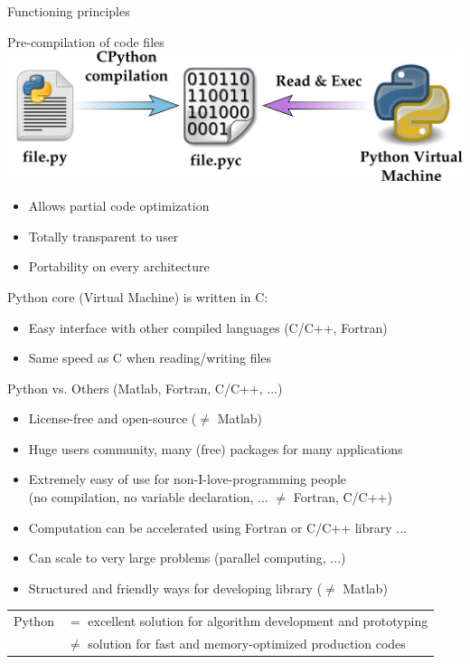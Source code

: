 \documentclass[11pt,unknownkeysallowed,usenames,dvipsnames]{beamer}
\begin{document}
	\begin{frame}{Functioning principles}
        \begin{block}{Pre-compilation of code files}
            \centering
            \includegraphics[width=0.8\linewidth]{cpython}
            
            \vspace*{-20pt}   
            \begin{itemize}
                \item Allows partial code optimization
                \item Totally transparent to user
                \item Portability on every architecture
            \end{itemize}
        \end{block}
        Python core (Virtual Machine) is written in C:
        
        \vspace*{-5pt}
        \begin{itemize}
            \item Easy interface with other compiled languages (C/C++, Fortran)
            \item Same speed as C when reading/writing files
        \end{itemize}
        
        \vspace*{-20pt}
    \end{frame}

	\begin{frame}{Python vs. Others (Matlab, Fortran, C/C++, ...)}
        \begin{itemize}
            \item License-free and open-source ($\neq$ Matlab)
            \item Huge users community, many (free) packages for many applications
            \item Extremely easy of use for non-I-love-programming people \\ (no compilation, no variable declaration, ... $\neq$ Fortran, C/C++)
            \item Computation can be accelerated using Fortran or C/C++
            library ... 
            \item Can scale to very large problems (parallel computing, ...)
            \item Structured and friendly ways for developing library ($\neq$ Matlab)
        \end{itemize}
		\begin{tabular}{rl}
			Python&$=$ excellent solution for algorithm development and prototyping\\
			&$\neq$ solution for fast and memory-optimized production codes
		\end{tabular}
	\end{frame}
\end{document}
